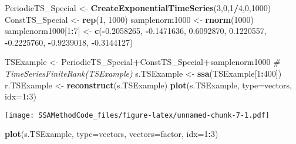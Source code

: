 \documentclass[
]{article}
\newenvironment{Shaded}{\begin{snugshade}}{\end{snugshade}}
\newcommand{\AttributeTok}[1]{\textcolor[rgb]{0.13,0.29,0.53}{#1}}
\newcommand{\CommentTok}[1]{\textcolor[rgb]{0.56,0.35,0.01}{\textit{#1}}}
\newcommand{\DecValTok}[1]{\textcolor[rgb]{0.00,0.00,0.81}{#1}}
\newcommand{\FloatTok}[1]{\textcolor[rgb]{0.00,0.00,0.81}{#1}}
\newcommand{\FunctionTok}[1]{\textcolor[rgb]{0.13,0.29,0.53}{\textbf{#1}}}
\newcommand{\NormalTok}[1]{#1}
\newcommand{\OtherTok}[1]{\textcolor[rgb]{0.56,0.35,0.01}{#1}}
\newcommand{\SpecialCharTok}[1]{\textcolor[rgb]{0.81,0.36,0.00}{\textbf{#1}}}
\newcommand{\StringTok}[1]{\textcolor[rgb]{0.31,0.60,0.02}{#1}}
\begin{document}
\begin{Shaded}
\begin{Highlighting}[]
\NormalTok{PeriodicTS\_Special }\OtherTok{\textless{}{-}} \FunctionTok{CreateExponentialTimeSeries}\NormalTok{(}\DecValTok{3}\NormalTok{,}\DecValTok{0}\NormalTok{,}\DecValTok{1}\SpecialCharTok{/}\DecValTok{4}\NormalTok{,}\DecValTok{0}\NormalTok{,}\DecValTok{1000}\NormalTok{)}
\NormalTok{ConstTS\_Special }\OtherTok{\textless{}{-}} \FunctionTok{rep}\NormalTok{(}\DecValTok{1}\NormalTok{, }\DecValTok{1000}\NormalTok{)}
\NormalTok{samplenorm1000 }\OtherTok{\textless{}{-}} \FunctionTok{rnorm}\NormalTok{(}\DecValTok{1000}\NormalTok{)}
\NormalTok{samplenorm1000[}\DecValTok{1}\SpecialCharTok{:}\DecValTok{7}\NormalTok{] }\OtherTok{\textless{}{-}} \FunctionTok{c}\NormalTok{(}\SpecialCharTok{{-}}\FloatTok{0.2058265}\NormalTok{, }\SpecialCharTok{{-}}\FloatTok{0.1471636}\NormalTok{, }\FloatTok{0.6092870}\NormalTok{, }\FloatTok{0.1220557}\NormalTok{, }\SpecialCharTok{{-}}\FloatTok{0.2225760}\NormalTok{, }\SpecialCharTok{{-}}\FloatTok{0.9239018}\NormalTok{, }\SpecialCharTok{{-}}\FloatTok{0.3144127}\NormalTok{)}
\end{Highlighting}
\end{Shaded}

\begin{Shaded}
\begin{Highlighting}[]
\NormalTok{TSExample }\OtherTok{\textless{}{-}}\NormalTok{ PeriodicTS\_Special}\SpecialCharTok{+}\NormalTok{ConstTS\_Special}\SpecialCharTok{+}\NormalTok{samplenorm1000}
\CommentTok{\# TimeSeriesFiniteRank(TSExample)}
\NormalTok{s.TSExample }\OtherTok{\textless{}{-}} \FunctionTok{ssa}\NormalTok{(TSExample[}\DecValTok{1}\SpecialCharTok{:}\DecValTok{400}\NormalTok{])}
\NormalTok{r.TSExample }\OtherTok{\textless{}{-}} \FunctionTok{reconstruct}\NormalTok{(s.TSExample)}
\FunctionTok{plot}\NormalTok{(s.TSExample, }\AttributeTok{type=}\StringTok{\textquotesingle{}vectors\textquotesingle{}}\NormalTok{, }\AttributeTok{idx=}\DecValTok{1}\SpecialCharTok{:}\DecValTok{3}\NormalTok{)}
\end{Highlighting}
\end{Shaded}

\texttt{[image: SSAMethodCode\_files/figure-latex/unnamed-chunk-7-1.pdf]}

\begin{Shaded}
\begin{Highlighting}[]
\FunctionTok{plot}\NormalTok{(s.TSExample, }\AttributeTok{type=}\StringTok{\textquotesingle{}vectors\textquotesingle{}}\NormalTok{, }\AttributeTok{vectors=}\StringTok{\textquotesingle{}factor\textquotesingle{}}\NormalTok{, }\AttributeTok{idx=}\DecValTok{1}\SpecialCharTok{:}\DecValTok{3}\NormalTok{)}
\end{Highlighting}
\end{Shaded}
\end{document}
